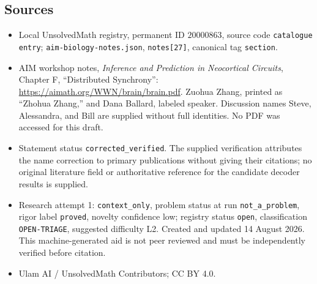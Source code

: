 \documentclass[11pt]{article}
\begin{document}
\subsection{Sources}
\begin{itemize}
\item Local UnsolvedMath registry, permanent ID \(20000863\), source code \texttt{catalogue entry}; \texttt{aim-biology-notes.json}, \texttt{notes[27]}, canonical tag \texttt{section}.
\item AIM workshop notes, \emph{Inference and Prediction in Neocortical Circuits}, Chapter F, ``Distributed Synchrony'': \url{https://aimath.org/WWN/brain/brain.pdf}. Zuohua Zhang, printed as ``Zhohua Zhang,'' and Dana Ballard, labeled speaker. Discussion names Steve, Alessandra, and Bill are supplied without full identities. No PDF was accessed for this draft.
\item Statement status \texttt{corrected\_verified}. The supplied verification attributes the name correction to primary publications without giving their citations; no original literature field or authoritative reference for the candidate decoder results is supplied.
\item Research attempt 1: \texttt{context\_only}, problem status at run \texttt{not\_a\_problem}, rigor label \texttt{proved}, novelty confidence low; registry status \texttt{open}, classification \texttt{OPEN-TRIAGE}, suggested difficulty L2. Created and updated 14 August 2026. This machine-generated aid is not peer reviewed and must be independently verified before citation.
\item Ulam AI / UnsolvedMath Contributors; CC BY 4.0.
\end{itemize}
\end{document}
